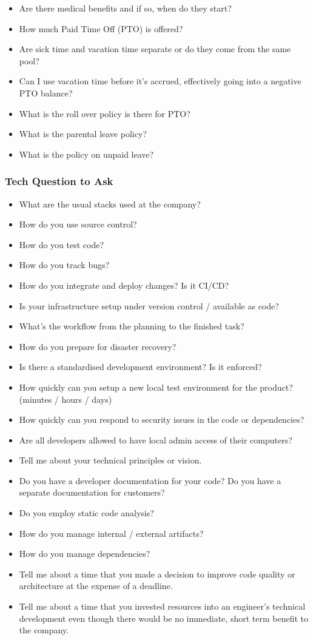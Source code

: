 \documentclass{article}
\begin{document}
\begin{itemize}
\item Are there medical benefits and if so, when do they start?
\item How much Paid Time Off (PTO) is offered?
\item Are sick time and vacation time separate or do they come from the same pool?
\item Can I use vacation time before it's accrued, effectively going into a negative PTO balance?
\item What is the roll over policy is there for PTO?
\item What is the parental leave policy?
\item What is the policy on unpaid leave?
\end{itemize}


\subsubsection{Tech Question to Ask}

\begin{itemize}
\item What are the usual stacks used at the company?
\item How do you use source control?
\item How do you test code?
\item How do you track bugs?
\item How do you integrate and deploy changes? Is it CI/CD?
\item Is your infrastructure setup under version control / available as code?
\item What's the workflow from the planning to the finished task?
\item How do you prepare for disaster recovery?
\item Is there a standardised development environment? Is it enforced?
\item How quickly can you setup a new local test environment for the product? (minutes / hours / days)
\item How quickly can you respond to security issues in the code or dependencies?
\item Are all developers allowed to have local admin access of their computers?
\item Tell me about your technical principles or vision.
\item Do you have a developer documentation for your code? Do you have a separate documentation for customers?
\item Do you employ static code analysis?
\item How do you manage internal / external artifacts?
\item How do you manage dependencies?
\item Tell me about a time that you made a decision to improve code quality or architecture at the expense of a deadline.
\item Tell me about a time that you invested resources into an engineer's technical development even though there would be no immediate, short term benefit to the company.
\end{itemize}
\end{document}
